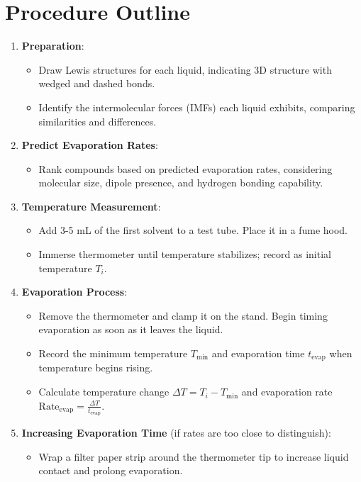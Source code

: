 \documentclass{article}
\begin{document}
\section*{Procedure Outline}
\begin{enumerate}
    \item \textbf{Preparation}:
    \begin{itemize}
        \item Draw Lewis structures for each liquid, indicating 3D structure with wedged and dashed bonds.
        \item Identify the intermolecular forces (IMFs) each liquid exhibits, comparing similarities and differences.
    \end{itemize}

    \item \textbf{Predict Evaporation Rates}:
    \begin{itemize}
        \item Rank compounds based on predicted evaporation rates, considering molecular size, dipole presence, and hydrogen bonding capability.
    \end{itemize}

    \item \textbf{Temperature Measurement}:
    \begin{itemize}
        \item Add 3-5 mL of the first solvent to a test tube. Place it in a fume hood.
        \item Immerse thermometer until temperature stabilizes; record as initial temperature $T_i$.
    \end{itemize}

    \item \textbf{Evaporation Process}:
    \begin{itemize}
        \item Remove the thermometer and clamp it on the stand. Begin timing evaporation as soon as it leaves the liquid.
        \item Record the minimum temperature $T_{\text{min}}$ and evaporation time $t_{\text{evap}}$ when temperature begins rising.
        \item Calculate temperature change $\Delta T = T_i - T_{\text{min}}$ and evaporation rate \( \text{Rate}_{\text{evap}} = \frac{\Delta T}{t_{\text{evap}}} \).
    \end{itemize}

    \item \textbf{Increasing Evaporation Time} (if rates are too close to distinguish):
    \begin{itemize}
        \item Wrap a filter paper strip around the thermometer tip to increase liquid contact and prolong evaporation.
    \end{itemize}


\end{enumerate}
\end{document}
